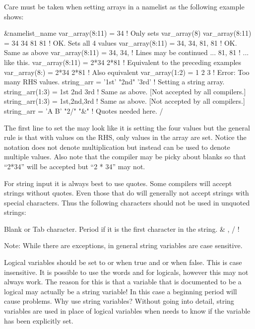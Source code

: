 Care must be taken when setting arrays in a namelist as the following example
shows:
\begin{example}
  &namelist_name
    var_array(8:11) = 34             ! Only sets var_array(8)
    var_array(8:11) = 34 34 81 81    ! OK. Sets all 4 values
    var_array(8:11) = 34, 34, 81, 81 ! OK. Same as above
    var_array(8:11) = 34, 34,        ! Lines may be continued ...
                      81, 81         !   ... like this.
    var_array(8:11) = 2*34 2*81      ! Equivalent to the preceding examples
    var_array(8:)   = 2*34 2*81      ! Also equivalent
    var_array(1:2) = 1 2 3           ! Error: Too many RHS values.
    string_arr = '1st' "2nd" '3rd'   ! Setting a string array.
    string_arr(1:3) = 1st 2nd 3rd    ! Same as above. [Not accepted by all compilers.]
    string_arr(1:3) = 1st,2nd,3rd    ! Same as above. [Not accepted by all compilers.]
    string_arr = 'A B' "2/" "&"      ! Quotes needed here.
  /
\end{example}
The first line to set the  may look like it is setting 
the four values  but the general rule is that with 
values on the RHS, only  values in the array are set. Notice the notation
 does not denote multiplication but instead can be used to denote
multiple values. Also note that the compiler may be picky about blanks so 
that ``2*34'' will be accepted but ``2 * 34'' may not.

For string input it is always best to use quotes. Some compilers will
accept strings without quotes. Even those that do will generally not
accept strings with special characters.  Thus the following characters
should not be used in unquoted strings:
\begin{example}
  Blank or Tab character.
  Period if it is the first character in the string.
  &   ,   /    !   %
\end{example}
Note: While there are exceptions, in general \tao string variables are
case sensitive.

Logical variables should be set to  or  when true and
 or  when false. This is case insensitive. It is
possible to use the words  and  for logicals,
however this may not always work. The reason for this is that a
variable that is documented to be a logical may actually be a string
variable! In this case a beginning period will cause problems. Why use
string variables? Without going into detail, string variables are used
in place of logical variables when \tao needs to know if the variable
has been explicitly set.

